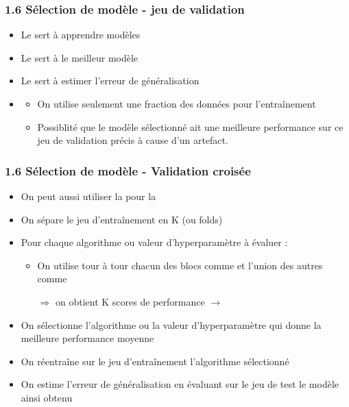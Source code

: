 \begin{frame}
  \frametitle{1.6 Sélection de modèle - jeu de validation}
  \begin{center}
  \end{center}
  \begin{itemize}
  \item Le  sert à apprendre  modèles
  \item Le  sert à  le meilleur modèle
  \item Le  sert à estimer l'erreur de généralisation 
  \pause
  \item {}
    \begin{itemize}
    \item On utilise seulement une fraction des données pour l'entraînement
    \item Possiblité que le modèle sélectionné ait une meilleure performance
      sur ce jeu de validation précis à cause d'un artefact.
    \end{itemize}
  \end{itemize}
\end{frame}

\begin{frame}
  \frametitle{1.6 Sélection de modèle - Validation croisée}
  \begin{itemize}
  \item On peut aussi utiliser la  pour la 
  \item On sépare le jeu d'entraînement en K  (ou folds)
  \item Pour chaque algorithme ou valeur d'hyperparamètre à évaluer :
    \begin{itemize}
    \item On utilise tour à tour chacun des blocs comme  et l'union des autres comme 
  \item[$\Rightarrow$] on obtient K scores de performance $\rightarrow$  
  \end{itemize}
\item On sélectionne l'algorithme ou la valeur d'hyperparamètre qui donne la meilleure performance moyenne
\item On réentraîne sur le jeu d'entraînement l'algorithme sélectionné
\item On estime l'erreur de généralisation en évaluant sur le jeu de test le modèle ainsi obtenu
  \end{itemize}
\end{frame}


